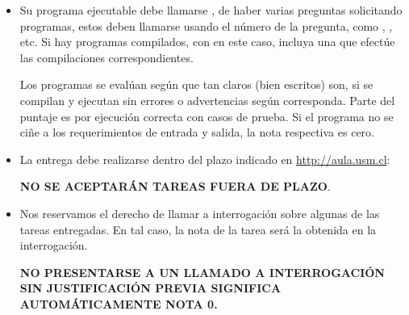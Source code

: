 \begin{itemize}
\ifprograms
  \item
    Su programa ejecutable debe llamarse ,
    de haber varias preguntas solicitando programas,
    estos deben llamarse usando el número de la pregunta,
    como ,
    ,
    etc.
    Si hay programas compilados, con en este caso,
    incluya una 
    que efectúe las compilaciones correspondientes.

    Los programas se evalúan según que tan claros
    (bien escritos)
    son, si se compilan y ejecutan sin errores o advertencias según corresponda.
    Parte del puntaje es por ejecución correcta con casos de prueba.
    Si el programa no se ciñe a los requerimientos de entrada y salida,
    la nota respectiva es cero.
\fi    
  \item
    La entrega debe realizarse dentro del plazo indicado en \url{http://aula.usm.cl}:

    \begin{center}
        \Large{
          \textbf{NO SE ACEPTARÁN TAREAS FUERA DE PLAZO}.
        }
        \normalsize
    \end{center}
     
    
  \item
    Nos reservamos el derecho de llamar a interrogación
    sobre algunas de las tareas entregadas.
    En tal caso,
    la nota de la tarea será la obtenida en la interrogación.
    \begin{center}
      \Large{
        \textbf{NO PRESENTARSE A UN LLAMADO A INTERROGACIÓN SIN JUSTIFICACIÓN PREVIA SIGNIFICA AUTOMÁTICAMENTE NOTA 0.}
      }
    \end{center}
    
  \end{itemize}


  
